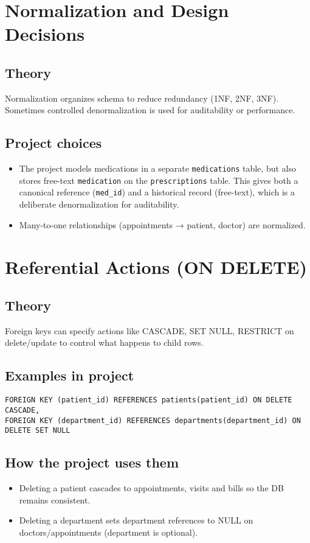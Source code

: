 \documentclass[11pt,a4paper]{article}
\begin{document}
\section{Normalization and Design Decisions}
\subsection{Theory}
Normalization organizes schema to reduce redundancy (1NF, 2NF, 3NF). Sometimes controlled denormalization is used for auditability or performance.

\subsection{Project choices}
\begin{itemize}
  \item The project models medications in a separate \texttt{medications} table, but also stores free-text \texttt{medication} on the \texttt{prescriptions} table. This gives both a canonical reference (\texttt{med_id}) and a historical record (free-text), which is a deliberate denormalization for auditability.
  \item Many-to-one relationships (appointments → patient, doctor) are normalized.
\end{itemize}

\section{Referential Actions (ON DELETE)}
\subsection{Theory}
Foreign keys can specify actions like CASCADE, SET NULL, RESTRICT on delete/update to control what happens to child rows.

\subsection{Examples in project}
\begin{lstlisting}
FOREIGN KEY (patient_id) REFERENCES patients(patient_id) ON DELETE CASCADE,
FOREIGN KEY (department_id) REFERENCES departments(department_id) ON DELETE SET NULL
\end{lstlisting}

\subsection{How the project uses them}
\begin{itemize}
  \item Deleting a patient cascades to appointments, visits and bills so the DB remains consistent.
  \item Deleting a department sets department references to NULL on doctors/appointments (department is optional).
\end{itemize}
\end{document}
